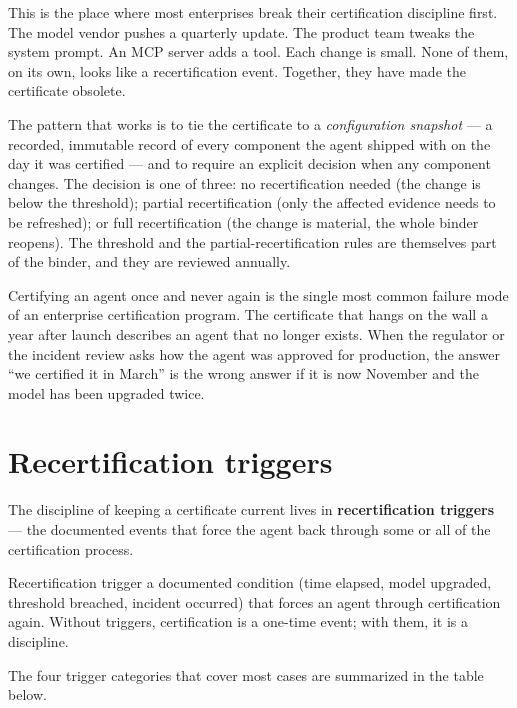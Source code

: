 This is the place where most enterprises break their certification discipline first. The model vendor pushes a quarterly update. The product team tweaks the system prompt. An MCP server adds a tool. Each change is small. None of them, on its own, looks like a recertification event. Together, they have made the certificate obsolete.

The pattern that works is to tie the certificate to a \textit{configuration snapshot} --- a recorded, immutable record of every component the agent shipped with on the day it was certified --- and to require an explicit decision when any component changes. The decision is one of three: no recertification needed (the change is below the threshold); partial recertification (only the affected evidence needs to be refreshed); or full recertification (the change is material, the whole binder reopens). The threshold and the partial-recertification rules are themselves part of the binder, and they are reviewed annually.

\begin{TNwarning} Certifying an agent once and never again is the single most common failure mode of an enterprise certification program. The certificate that hangs on the wall a year after launch describes an agent that no longer exists. When the regulator or the incident review asks how the agent was approved for production, the answer ``we certified it in March'' is the wrong answer if it is now November and the model has been upgraded twice. \end{TNwarning}

\section{Recertification triggers}

The discipline of keeping a certificate current lives in \textbf{recertification triggers} --- the documented events that force the agent back through some or all of the certification process.

\begin{TNdefinition}{Recertification trigger} a documented condition (time elapsed, model upgraded, threshold breached, incident occurred) that forces an agent through certification again. Without triggers, certification is a one-time event; with them, it is a discipline. \end{TNdefinition}

The four trigger categories that cover most cases are summarized in the table below.

